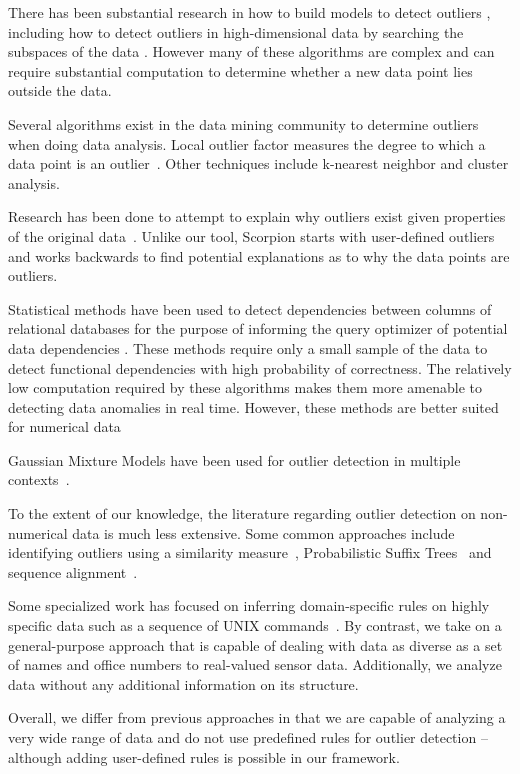 
There has been substantial research in how to build models to detect outliers \cite{Aggarwal2013}, including how to detect outliers in high-dimensional data by searching the subspaces of the data \cite{Zhang2004}\cite{Kriegel2009}.
However many of these algorithms are complex and can require substantial computation to determine whether a new data point lies outside the data.

Several algorithms exist in the data mining community to determine outliers when doing data analysis.
Local outlier factor measures the degree to which a data point is an outlier~\cite{Breunig2000}.
Other techniques include k-nearest neighbor and cluster analysis.

Research has been done to attempt to explain why outliers exist given properties of the original data~\cite{Wu}. Unlike our tool, Scorpion starts with user-defined outliers and works backwards to find potential explanations as to why the data points are outliers.

Statistical methods have been used to detect dependencies between columns of relational databases for the purpose of informing the query optimizer of potential data dependencies \cite{Ilyas2004}. These methods require only a small sample of the data to detect functional dependencies with high probability of correctness. The relatively low computation required by these algorithms makes them more amenable to detecting data anomalies in real time. However, these methods are better suited for numerical data~\cite{Hodge2004}

Gaussian Mixture Models have been used for outlier detection in multiple contexts~\cite{Lu2005,Roberts1994,Roberts1999}.

To the extent of our knowledge, the literature regarding outlier detection on non-numerical data is much less extensive. Some common approaches include identifying outliers using a similarity measure~\cite{Budalakoti2006}, Probabilistic Suffix Trees~\cite{Sun2006} and sequence alignment~\cite{Bouarfa2012}.

Some specialized work has focused on inferring domain-specific rules on highly specific data such as a sequence of UNIX commands~\cite{Lane1997a,Lane1997b}. By contrast, we take on a general-purpose approach that is capable of dealing with data as diverse as a set of names and office numbers to real-valued sensor data. Additionally, we analyze data without any additional information on its structure.

Overall, we differ from previous approaches in that we are capable of analyzing a very wide range of data and do not use predefined rules for outlier detection -- although adding user-defined rules is possible in our framework.

